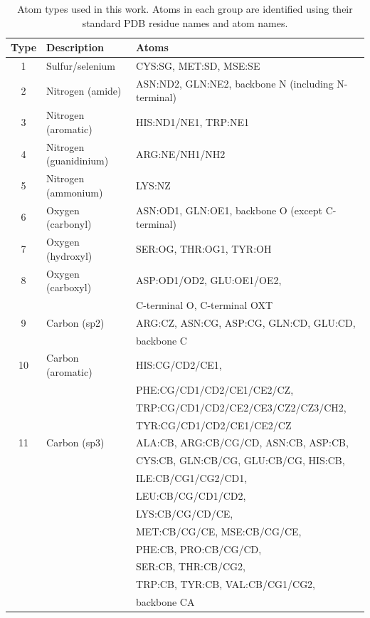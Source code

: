 \documentclass{bioinfo}
\begin{document}
\begin{table}[!t]
\begin{center}
\begin{tabular}{ c | l | l }
    
    Type & Description & Atoms \\
    \hline
    1 & Sulfur/selenium & CYS:SG, MET:SD, MSE:SE \\ \hline
    2 & Nitrogen (amide) & ASN:ND2, GLN:NE2, backbone N (including N-terminal) \\ \hline
    3 & Nitrogen (aromatic) & HIS:ND1/NE1, TRP:NE1 \\ \hline
    4 & Nitrogen (guanidinium) & ARG:NE/NH1/NH2 \\ \hline
    5 & Nitrogen (ammonium) & LYS:NZ \\ \hline
    6 & Oxygen (carbonyl) & ASN:OD1, GLN:OE1, backbone O (except C-terminal) \\ \hline
    7 & Oxygen (hydroxyl) & SER:OG, THR:OG1, TYR:OH \\ \hline
    8 & Oxygen (carboxyl) & ASP:OD1/OD2, GLU:OE1/OE2, \\
     & & C-terminal O, C-terminal OXT \\ \hline
    9 & Carbon (sp2) & ARG:CZ, ASN:CG, ASP:CG, GLN:CD, GLU:CD, \\
     & & backbone C \\ \hline
    10 & Carbon (aromatic) & HIS:CG/CD2/CE1, \\
     & & PHE:CG/CD1/CD2/CE1/CE2/CZ, \\ 
     & & TRP:CG/CD1/CD2/CE2/CE3/CZ2/CZ3/CH2, \\
     & & TYR:CG/CD1/CD2/CE1/CE2/CZ \\ \hline
    11 & Carbon (sp3) & ALA:CB, ARG:CB/CG/CD, ASN:CB, ASP:CB, \\
     & & CYS:CB, GLN:CB/CG, GLU:CB/CG, HIS:CB, \\
     & & ILE:CB/CG1/CG2/CD1, \\
     & & LEU:CB/CG/CD1/CD2, \\
     & & LYS:CB/CG/CD/CE, \\
     & & MET:CB/CG/CE, MSE:CB/CG/CE, \\
     & & PHE:CB, PRO:CB/CG/CD, \\
     & & SER:CB, THR:CB/CG2, \\
     & & TRP:CB, TYR:CB, VAL:CB/CG1/CG2, \\
     & & backbone CA \\ \hline    
\end{tabular}
    
    \caption {Atom types used in this work. Atoms in each group are
    identified using their standard PDB residue names and atom names.}

    \label{Tbl:atomTypes}
\end{center}
\end{table}
\end{document}
